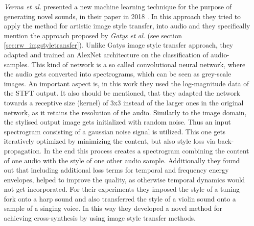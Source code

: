 \textit{Verma et al.} presented a new machine learning technique for the purpose of generating novel sounds, in their paper in 2018 \cite{verma2018neural}. In this approach they tried to apply the method for artistic image style transfer, into audio and they specifically mention the approach proposed by \textit{Gatys et al.}\cite{Gatys2016} (see section \ref{sec:rw_imgstyletransfer}). Unlike Gatys image style transfer approach, they adapted and trained an AlexNet architecture on the classification of audio-samples. This kind of network is a so called convolutional neural network, where the audio gets converted into spectrograms, which can be seen as grey-scale images. An important aspect is, in this work they used the log-magnitude data of the STFT output. It also should be mentioned, that they adapted the network towards a receptive size (kernel) of 3x3 instead of the larger ones in the original network, as it retains the resolution of the audio. Similarly to the image domain, the stylised output image gets initialized with random noise. Thus an input spectrogram consisting of a gaussian noise signal is utilized. This one gets iteratively optimized by minimizing the content, but also style loss via back-propagation. In the end this process creates a spectrogram combining the content of one audio with the style of one other audio sample. Additionally they found out that including additional loss terms for temporal and frequency energy envelopes, helped to improve the quality, as otherwise temporal dynamics would not get incorporated. For their experiments they imposed the style of a tuning fork onto a harp sound and also transferred the style of a violin sound onto a sample of a singing voice. In this way they developed a novel method for achieving cross-synthesis by using image style transfer methods.\\

